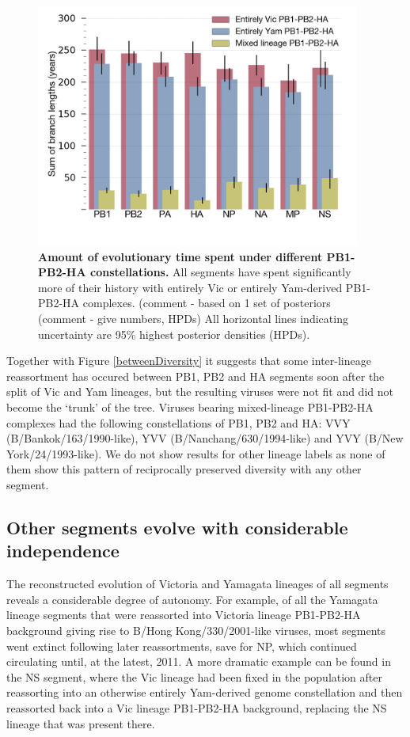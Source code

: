\documentclass[11pt,oneside,letterpaper]{article}
\begin{document}
\begin{figure}[h]
	\centering		
	\includegraphics[width=0.95\textwidth]{figures/InfB_stateTime.png}
	\caption{\textbf{Amount of evolutionary time spent under different PB1-PB2-HA constellations.}
All segments have spent significantly more of their history with entirely Vic or entirely Yam-derived PB1-PB2-HA complexes.
(comment - based on 1 set of posteriors (comment - give numbers, HPDs)
All horizontal lines indicating uncertainty are 95\% highest posterior densities (HPDs).}
	\label{stateTime}
\end{figure}

Together with Figure \ref{betweenDiversity} it suggests that some inter-lineage reassortment has occured between PB1, PB2 and HA segments soon after the split of Vic and Yam lineages, but the resulting viruses were not fit and did not become the `trunk' of the tree.
Viruses bearing mixed-lineage PB1-PB2-HA complexes had the following constellations of PB1, PB2 and HA: VVY (B/Bankok/163/1990-like), YVV (B/Nanchang/630/1994-like) and YVY (B/New York/24/1993-like).
We do not show results for other lineage labels as none of them show this pattern of reciprocally preserved diversity with any other segment.

\subsection*{Other segments evolve with considerable independence}
The reconstructed evolution of Victoria and Yamagata lineages of all segments reveals a considerable degree of autonomy.
For example, of all the Yamagata lineage segments that were reassorted into Victoria lineage PB1-PB2-HA background giving rise to B/Hong Kong/330/2001-like viruses, most segments went extinct following later reassortments, save for NP, which continued circulating until, at the latest, 2011.
A more dramatic example can be found in the NS segment, where the Vic lineage had been fixed in the population after reassorting into an otherwise entirely Yam-derived genome constellation and then reassorted back into a Vic lineage PB1-PB2-HA background, replacing the NS lineage that was present there. 
\end{document}
